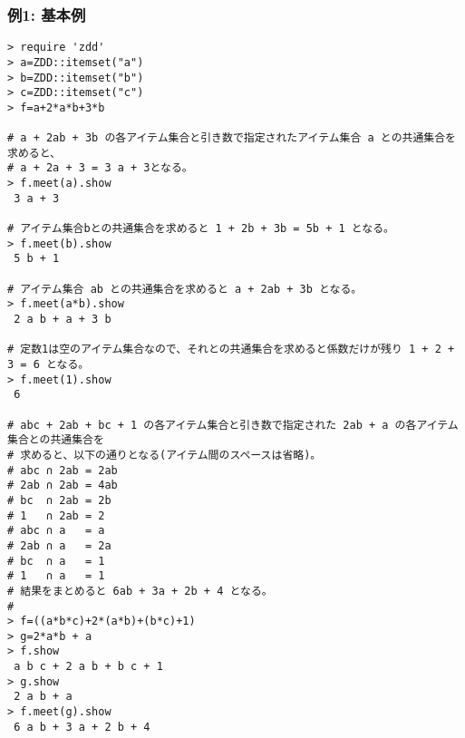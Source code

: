 \subsubsection*{例1: 基本例}



\begin{Verbatim}[baselinestretch=0.7,frame=single]
> require 'zdd'
> a=ZDD::itemset("a")
> b=ZDD::itemset("b")
> c=ZDD::itemset("c")
> f=a+2*a*b+3*b

# a + 2ab + 3b の各アイテム集合と引き数で指定されたアイテム集合 a との共通集合を求めると、
# a + 2a + 3 = 3 a + 3となる。
> f.meet(a).show
 3 a + 3

# アイテム集合bとの共通集合を求めると 1 + 2b + 3b = 5b + 1 となる。
> f.meet(b).show
 5 b + 1

# アイテム集合 ab との共通集合を求めると a + 2ab + 3b となる。
> f.meet(a*b).show
 2 a b + a + 3 b

# 定数1は空のアイテム集合なので、それとの共通集合を求めると係数だけが残り 1 + 2 + 3 = 6 となる。
> f.meet(1).show
 6

# abc + 2ab + bc + 1 の各アイテム集合と引き数で指定された 2ab + a の各アイテム集合との共通集合を
# 求めると、以下の通りとなる(アイテム間のスペースは省略)。
# abc ∩ 2ab = 2ab
# 2ab ∩ 2ab = 4ab
# bc  ∩ 2ab = 2b
# 1   ∩ 2ab = 2
# abc ∩ a   = a
# 2ab ∩ a   = 2a
# bc  ∩ a   = 1
# 1   ∩ a   = 1
# 結果をまとめると 6ab + 3a + 2b + 4 となる。
#
> f=((a*b*c)+2*(a*b)+(b*c)+1)
> g=2*a*b + a
> f.show
 a b c + 2 a b + b c + 1
> g.show
 2 a b + a
> f.meet(g).show
 6 a b + 3 a + 2 b + 4
\end{Verbatim}

